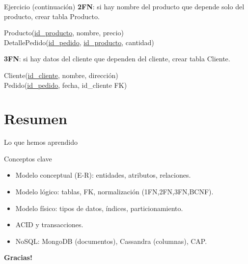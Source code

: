 \documentclass[aspectratio=169, 10pt, xcolor=table]{beamer}
\begin{document}
\begin{frame}{Ejercicio (continuación)}
    \textbf{2FN}: si hay nombre del producto que depende solo del producto, crear tabla Producto.
    \begin{center}
        Producto(\underline{id\_producto}, nombre, precio) \\
        DetallePedido(\underline{id\_pedido}, \underline{id\_producto}, cantidad)
    \end{center}
    \textbf{3FN}: si hay datos del cliente que dependen del cliente, crear tabla Cliente.
    \begin{center}
        Cliente(\underline{id\_cliente}, nombre, dirección) \\
        Pedido(\underline{id\_pedido}, fecha, id\_cliente FK)
    \end{center}
\end{frame}

\section{Resumen}

\begin{frame}{Lo que hemos aprendido}
    \begin{exampleblock}{Conceptos clave}
        \begin{itemize}
            \item Modelo conceptual (E-R): entidades, atributos, relaciones.
            \item Modelo lógico: tablas, FK, normalización (1FN,2FN,3FN,BCNF).
            \item Modelo físico: tipos de datos, índices, particionamiento.
            \item ACID y transacciones.
            \item NoSQL: MongoDB (documentos), Cassandra (columnas), CAP.
        \end{itemize}
    \end{exampleblock}
\end{frame}

\begin{frame}
    \centering
    \Huge \textbf{Gracias!}

\end{frame}
\end{document}

